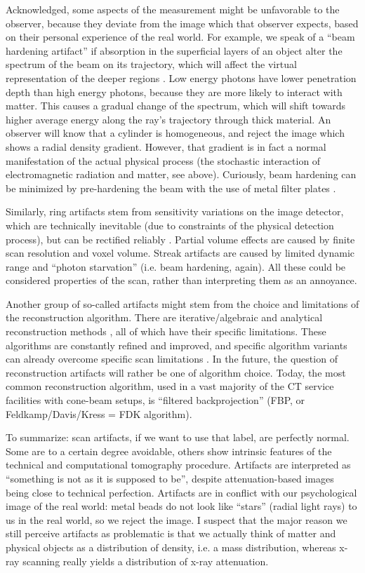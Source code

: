 Acknowledged, some aspects of the measurement might be unfavorable to the observer, because they deviate from the image which that observer expects, based on their personal experience of the real world.
For example, we speak of a ``beam hardening artifact'' if absorption in the superficial layers of an object alter the spectrum of the beam on its trajectory, which will affect the virtual representation of the deeper regions \citep{VanGompel2011}.
Low energy photons have lower penetration depth than high energy photons, because they are more likely to interact with matter.
This causes a gradual change of the spectrum, which will shift towards higher average energy along the ray's trajectory through thick material.
An observer will know that a cylinder is homogeneous, and reject the image which shows a radial density gradient.
However, that gradient is in fact a normal manifestation of the actual physical process (the stochastic interaction of electromagnetic radiation and matter, see above).
Curiously, beam hardening can be minimized by pre-hardening the beam with the use of metal filter plates \citep{Triche2019}.

Similarly, ring artifacts stem from sensitivity variations on the image detector, which are technically inevitable (due to constraints of the physical detection process), but can be rectified reliably \citep{Sijbers2004}.
Partial volume effects are caused by finite scan resolution and voxel volume.
Streak artifacts are caused by limited dynamic range and ``photon starvation'' (i.e. beam hardening, again).
All these could be considered properties of the scan, rather than interpreting them as an annoyance.

Another group of so-called artifacts might stem from the choice and limitations of the reconstruction algorithm.
There are iterative/algebraic and analytical reconstruction methods \citep{Gilbert1972,Andersen1984,Feldkamp1984,Geyer2015,Hansen2021}, all of which have their specific limitations.
These algorithms are constantly refined and improved, and specific algorithm variants can already overcome specific scan limitations \citep[e.g.][]{Six2019,Frenkel2022}.
In the future, the question of reconstruction artifacts will rather be one of algorithm choice.
Today, the most common reconstruction algorithm, used in a vast majority of the CT service facilities with cone-beam setups, is ``filtered backprojection'' (FBP, or Feldkamp/Davis/Kress = FDK algorithm).


To summarize: scan artifacts, if we want to use that label, are perfectly normal.
Some are to a certain degree avoidable, others show intrinsic features of the technical and computational tomography procedure.
Artifacts are interpreted as ``something is not as it is supposed to be'', despite attenuation-based images being close to technical perfection.
Artifacts are in conflict with our psychological image of the real world: metal beads do not look like ``stars'' (radial light rays) to us in the real world, so we reject the image.
I suspect that the major reason we still perceive artifacts as problematic is that we actually think of matter and physical objects as a distribution of density, i.e. a mass distribution, whereas x-ray scanning really yields a distribution of x-ray attenuation.

